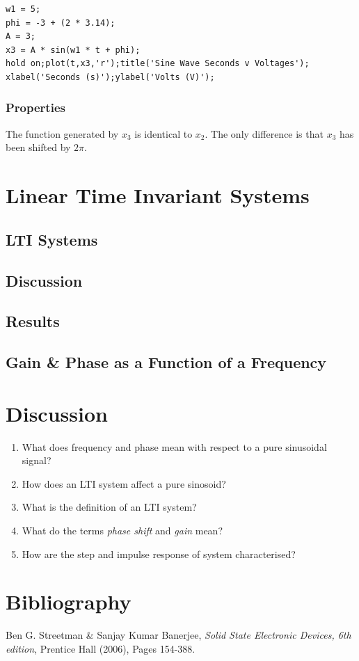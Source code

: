 \documentclass[12pt]{article}
\begin{document}
\begin{lstlisting}
w1 = 5;
phi = -3 + (2 * 3.14);
A = 3;
x3 = A * sin(w1 * t + phi);
hold on;plot(t,x3,'r');title('Sine Wave Seconds v Voltages');
xlabel('Seconds (s)');ylabel('Volts (V)');
\end{lstlisting}

\subsubsection{Properties}
The function generated by $x_3$ is identical to $x_2$. The only difference is that $x_3$ has been shifted by $2\pi$.
\section{Linear Time Invariant Systems}
\subsection{LTI Systems}

\subsection{Discussion}

\subsection{Results}

\subsection{Gain \& Phase as a Function of a Frequency}

\section{Discussion}
\begin{enumerate}
\item What does frequency and phase mean with respect to a pure sinusoidal signal?
\item How does an LTI system affect a pure sinosoid?
\item What is the definition of an LTI system?
\item What do the terms \emph{phase shift} and \emph{gain} mean?
\item How are the step and impulse response of system characterised?
\end{enumerate}

\section{Bibliography}
\begin{thebibliography}{3}
  Ben G. Streetman \& Sanjay Kumar Banerjee,
  \emph{Solid State Electronic Devices, 6th edition},
  Prentice Hall (2006),
  Pages 154-388.
\end{thebibliography}
\end{document}
